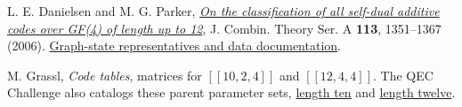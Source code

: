 \documentclass[11pt]{article}
\begin{document}
L. E. Danielsen and M. G. Parker, \href{https://doi.org/10.1016/j.jcta.2005.12.004}{\emph{On the classification of all self-dual additive codes over GF(4) of length up to 12}}, J. Combin. Theory Ser. A \textbf{113}, 1351--1367 (2006). \href{https://www.codetables.de/larsed/vncorbits/}{Graph-state representatives and data documentation}.

M. Grassl, \emph{Code tables}, matrices for \href{https://codetables.de/QECC.php?q=4\&n=10\&k=2}{$[[10,2,4]]$} and \href{https://codetables.de/QECC.php?q=4\&n=12\&k=4}{$[[12,4,4]]$}. The QEC Challenge also catalogs these parent parameter sets, \href{https://qecchallenge.com/codes/10-2-4.html}{length ten} and \href{https://qecchallenge.com/codes/12-4-4.html}{length twelve}.
\end{document}
